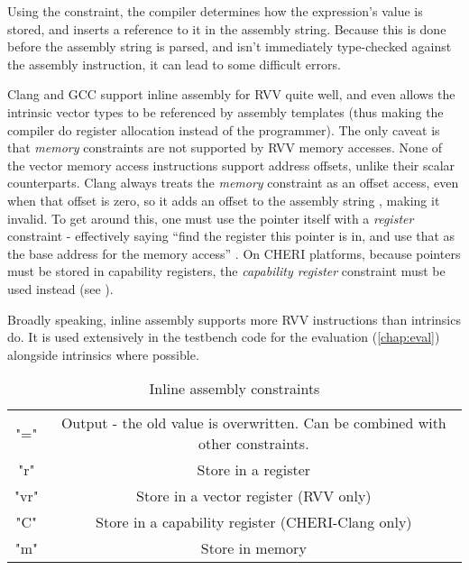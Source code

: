 Using the constraint, the compiler determines how the expression's value is stored, and inserts a reference to it in the assembly string.
Because this is done before the assembly string is parsed, and isn't immediately type-checked against the assembly instruction, it can lead to some difficult errors.

Clang and GCC support inline assembly for RVV quite well, and even allows the intrinsic vector types to be referenced by assembly templates (thus making the compiler do register allocation instead of the programmer).
The only caveat is that \emph{memory} constraints are not supported by RVV memory accesses.
None of the vector memory access instructions support address offsets, unlike their scalar counterparts.
Clang always treats the \emph{memory} constraint as an offset access, even when that offset is zero, so it adds an offset to the assembly string , making it invalid.
To get around this, one must use the pointer itself with a \emph{register} constraint - effectively saying \enquote{find the register this pointer is in, and use that as the base address for the memory access} .
On CHERI platforms, because pointers must be stored in capability registers, the \emph{capability register} constraint must be used instead (see ).

Broadly speaking, inline assembly supports more RVV instructions than intrinsics do.
It is used extensively in the testbench code for the evaluation (\cref{chap:eval}) alongside intrinsics where possible.


\begin{table}[]
    \centering
    \begin{tabular}{c|c}
       "="  & Output - the old value is overwritten. Can be combined with other constraints. \\
        "r" & Store in a register \\
        "vr" & Store in a vector register (RVV only) \\
        "C" & Store in a capability register (CHERI-Clang only) \\
        "m" & Store in memory \\
    \end{tabular}
    \caption{Inline assembly constraints\cite[Section 6.47.2]{UsingGNUCompiler2022}}
    \label{tab:inline_asm_constraints}
\end{table}

